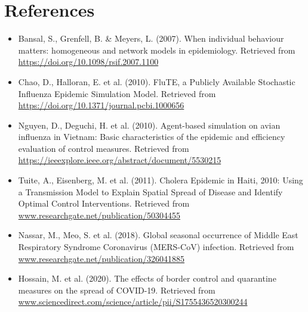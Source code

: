 \documentclass[14pt, a4paper]{extarticle}
\begin{document}
    \newpage
    \section{References}
	    \begin{itemize}
            \item Bansal, S., Grenfell, B. \& Meyers, L. (2007). When individual behaviour matters: homogeneous and network models in epidemiology. Retrieved from \url{https://doi.org/10.1098/rsif.2007.1100}
            
            \item Chao, D., Halloran, E. et al. (2010). FluTE, a Publicly Available Stochastic Influenza Epidemic Simulation Model. Retrieved from \url{https://doi.org/10.1371/journal.pcbi.1000656}
            
            \item Nguyen, D., Deguchi, H. et al. (2010). Agent-based simulation on avian influenza in Vietnam: Basic characteristics of the epidemic and efficiency evaluation of control measures. Retrieved from \url{https://ieeexplore.ieee.org/abstract/document/5530215}
            
            \item Tuite, A., Eisenberg, M. et al. (2011). Cholera Epidemic in Haiti, 2010: Using a Transmission Model to Explain Spatial Spread of Disease and Identify Optimal Control Interventions. Retrieved from \url{www.researchgate.net/publication/50304455}
            
            \item Nassar, M., Meo, S. et al. (2018). Global seasonal occurrence of Middle East Respiratory Syndrome Coronavirus (MERS-CoV) infection. Retrieved from \url{www.researchgate.net/publication/326041885}
            
            \item Hossain, M. et al. (2020). The effects of border control and quarantine measures on the spread of COVID-19. Retrieved from \url{www.sciencedirect.com/science/article/pii/S1755436520300244}
        \end{itemize}
            
\end{document}
